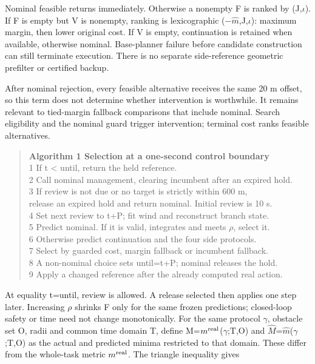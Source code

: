 \documentclass[conference]{IEEEtran}
\begin{document}
Nominal feasible returns immediately. Otherwise a nonempty F is ranked by (J,\ensuremath{\iota}). If F is empty but V is nonempty, ranking is lexicographic (\ensuremath{-}$\hat m$,J,\ensuremath{\iota}): maximum margin, then lower original cost. If V is empty, continuation is retained when available, otherwise nominal. Base-planner failure before candidate construction can still terminate execution. There is no separate side-reference geometric prefilter or certified backup.

After nominal rejection, every feasible alternative receives the same 20 m offset, so this term does not determine whether intervention is worthwhile. It remains relevant to tied-margin fallback comparisons that include nominal. Search eligibility and the nominal guard trigger intervention; terminal cost ranks feasible alternatives.

\begin{quote}\noindent\textbf{Algorithm 1  Selection at a one-second control boundary}\\[2pt]


1  If t < until, return the held reference. \\
2  Call nominal management, clearing incumbent after an expired hold. \\
3  If review is not due or no target is strictly within 600 m, \\
   release an expired hold and return nominal. Initial review is 10 s. \\
4  Set next review to t+P; fit wind and reconstruct branch state. \\
5  Predict nominal. If it is valid, integrates and meets \ensuremath{\rho}, select it. \\
6  Otherwise predict continuation and the four side protocols. \\
7  Select by guarded cost, margin fallback or incumbent fallback. \\
8  A non-nominal choice sets until=t+P; nominal releases the hold. \\
9  Apply a changed reference after the already computed real action.
\end{quote}

At equality t=until, review is allowed. A release selected then applies one step later. Increasing \ensuremath{\rho} shrinks F only for the same frozen predictions; closed-loop safety or time need not change monotonically. For the same protocol \ensuremath{\gamma}, obstacle set O, radii and common time domain T, define M=$m^{\rm real}$(\ensuremath{\gamma};T,O) and $\widehat M$=$\hat m$(\ensuremath{\gamma};T,O) as the actual and predicted minima restricted to that domain. These differ from the whole-task metric $m^{\rm real}$. The triangle inequality gives
\end{document}
